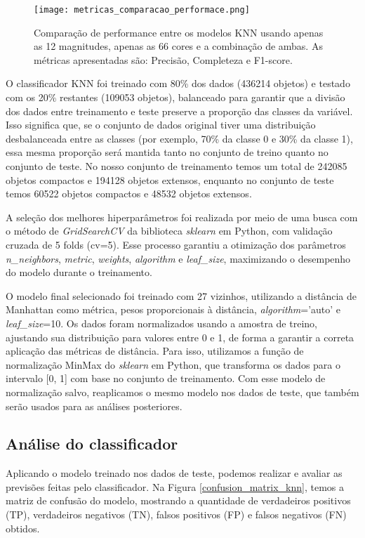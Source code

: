 \begin{figure}[!ht]
    \centering
    \texttt{[image: metricas\_comparacao\_performace.png]}
    \caption[]{Comparação de performance entre os modelos KNN usando apenas as 12 magnitudes, apenas as 66 cores e a combinação de ambas. As métricas apresentadas são: Precisão, Completeza e F1-score.}
    \label{metricas_comparacao_performace}
\end{figure}

O classificador KNN foi treinado com 80\% dos dados (436214 objetos) e testado com os 20\% restantes (109053 objetos), balanceado para garantir que a divisão dos dados entre treinamento e teste preserve a proporção das classes da variável. Isso significa que, se o conjunto de dados original tiver uma distribuição desbalanceada entre as classes (por exemplo, 70\% da classe 0 e 30\% da classe 1), essa mesma proporção será mantida tanto no conjunto de treino quanto no conjunto de teste. No nosso conjunto de treinamento temos um total de 242085 objetos compactos e 194128 objetos extensos, enquanto no conjunto de teste temos 60522 objetos compactos e 48532 objetos extensos.

A seleção dos melhores hiperparâmetros foi realizada por meio de uma busca com o método de \textit{GridSearchCV} da biblioteca \textit{sklearn} em Python, com validação cruzada de 5 folds (cv=5). Esse processo garantiu a otimização dos parâmetros \textit{n\_neighbors}, \textit{metric}, \textit{weights}, \textit{algorithm} e \textit{leaf\_size}, maximizando o desempenho do modelo durante o treinamento.

O modelo final selecionado foi treinado com 27 vizinhos, utilizando a distância de Manhattan como métrica, pesos proporcionais à distância, \textit{algorithm}='auto' e \textit{leaf\_size}=10. Os dados foram normalizados usando a amostra de treino, ajustando sua distribuição para valores entre 0 e 1, de forma a garantir a correta aplicação das métricas de distância. Para isso, utilizamos a função de normalização MinMax do \textit{sklearn} em Python, que transforma os dados para o intervalo [0, 1] com base no conjunto de treinamento. Com esse modelo de normalização salvo, reaplicamos o mesmo modelo nos dados de teste, que também serão usados para as análises posteriores.

\subsection{Análise do classificador}\label{subsec:analise_modelo}
Aplicando o modelo treinado nos dados de teste, podemos realizar e avaliar as previsões feitas pelo classificador. Na Figura \ref{confusion_matrix_knn}, temos a matriz de confusão do modelo, mostrando a quantidade de verdadeiros positivos (TP), verdadeiros negativos (TN), falsos positivos (FP) e falsos negativos (FN) obtidos.

